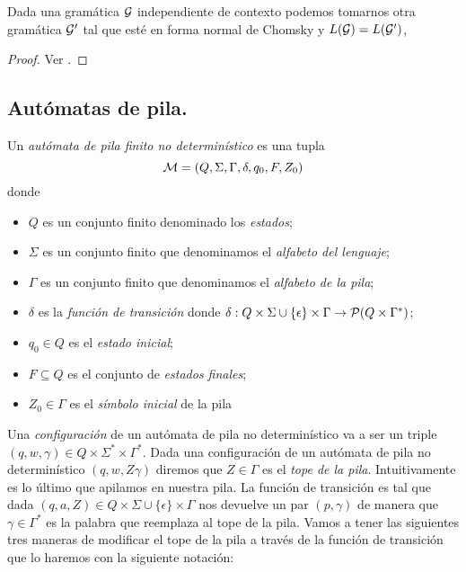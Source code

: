 \documentclass[tesis.tex]{subfiles}
\begin{document}
\begin{prop}
	Dada una gramática $\cal G$ independiente de contexto podemos tomarnos otra gramática $\cal G'$ tal que esté en forma normal de Chomsky y $L({\cal G}) = L(\cal G')$,
\end{prop}

\begin{proof}
	Ver \cite{hopcraft-ullman}.
\end{proof}

\subsection{Autómatas de pila.}

\begin{deff}\label{deff_apnd}
	Un \emph{autómata de pila finito no determinístico} es una tupla 
	\[
	{\cal M } = (Q, \Sigma, \Gamma, \delta, q_0, F, Z_0)
	\]
	donde 
	\begin{itemize}
		\item $Q$ es un conjunto finito denominado los \emph{estados};
		\item $\Sigma$ es un conjunto finito que denominamos el \emph{alfabeto del lenguaje};
		\item $\Gamma$ es un conjunto finito que denominamos el \emph{alfabeto de la pila};
		\item $\delta$ es la \emph{función de transición} donde $\delta: Q  \times \Sigma \cup \{ \epsilon \} \times \Gamma \to {\cal P}( Q  \times \Gamma^*)$;
		\item $q_0 \in Q$ es el \emph{estado inicial};
		\item $F \subseteq Q$ es el conjunto de \emph{estados finales};
		\item $Z_{0} \in \Gamma$ es el \emph{símbolo inicial} de la pila
	\end{itemize}
\end{deff}

Una \emph{configuración} de un autómata de pila no determinístico va a ser un triple $(q,w,\gamma) \in Q \times \Sigma^* \times \Gamma^*$.
Dada una configuración de un autómata de pila no determinístico $(q,w, Z\gamma)$ diremos que $Z \in \Gamma$ es el \emph{tope de la pila}.
Intuitivamente es lo último que apilamos en nuestra pila.
La función de transición es tal que dada $(q,a,Z) \in Q  \times \Sigma \cup \{ \epsilon \} \times \Gamma $ nos devuelve un par $(p,\gamma)$ de manera que $\gamma \in \Gamma^{*}$ es la palabra que reemplaza al tope de la pila.
Vamos a tener las siguientes tres maneras de modificar el tope de la pila a través de la función de transición que lo haremos con la siguiente notación:
\end{document}
